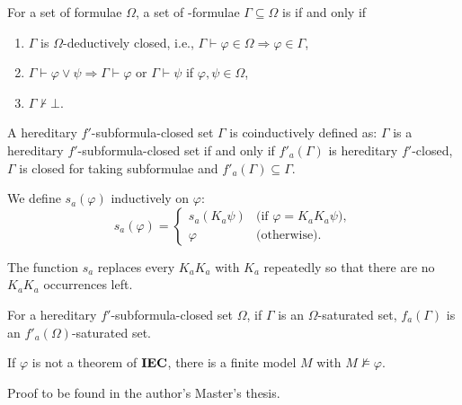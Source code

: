   \begin{definition}
   \label{saturated-set}
   For a set of formulae $\Omega$,
   a set of \iec-formulae $\Gamma\subseteq\Omega$ is  if and only if
   \begin{enumerate}
    \item $\Gamma$ is $\Omega$-deductively closed, i.e., $\Gamma\vdash\varphi\in
	  \Omega\Rightarrow
	  \varphi\in\Gamma$,
    \item $\Gamma\vdash\varphi\vee\psi \Rightarrow \Gamma\vdash\varphi$ or $\Gamma\vdash\psi$
	  if $\varphi,\psi\in\Omega$,
    \item $\Gamma\not\vdash\bot$.
   \end{enumerate}
  \end{definition}

  \begin{definition}
   A hereditary $f'$-subformula-closed set $\Gamma$ is coinductively defined as:
   $\Gamma$ is a hereditary $f'$-subformula-closed set if and only
   if $f'_a(\Gamma)$ is hereditary $f'$-closed, $\Gamma$ is closed for taking subformulae and
   $f'_a(\Gamma)\subseteq \Gamma$.
  \end{definition}

  \begin{definition}
   We define $s_a(\varphi)$ inductively on $\varphi$:
   \[
   s_a(\varphi) = \begin{cases}
		   s_a(K_a\psi) & \text{(if $\varphi = K_aK_a\psi$)},\\
		   \varphi & \text{(otherwise)}.
		  \end{cases}
   \]
  \end{definition}
  \noindent The function $s_a$ replaces every $K_aK_a$ with $K_a$ repeatedly so that there are no
  $K_aK_a$ occurrences left.

  \begin{proposition}
   \label{fpreserve}
   For a hereditary $f'$-subformula-closed set $\Omega$,
   if $\Gamma$ is an $\Omega$-saturated set,
   $f_a(\Gamma)$ is an $f'_a(\Omega)$-saturated set.
  \end{proposition}

  \newcommand{\natpls}{{\mathbb N}^{+}}

\begin{proposition}
 \label{fmp}
 If $\varphi$ is not a theorem of ${\rm {\textbf{IEC}}}$,
 there is a finite model $M$ with $M\not\models\varphi$.
\end{proposition}
Proof to be found in the author's Master's thesis.

